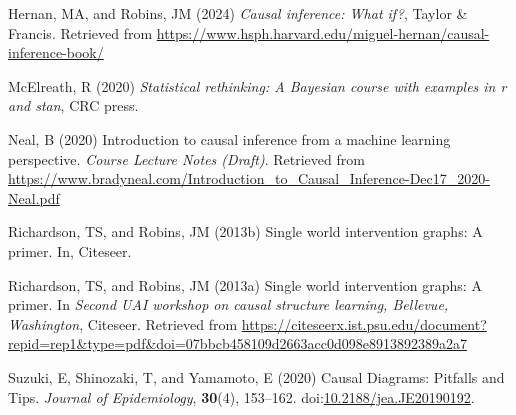 \documentclass[
  single column]{article}
\newlength{\cslhangindent}
\newenvironment{CSLReferences}[2] %
 {\begin{list}{}{%
  \setlength{\itemindent}{0pt}
  \setlength{\leftmargin}{0pt}
  \setlength{\parsep}{0pt}
  \ifodd #1
   \setlength{\leftmargin}{\cslhangindent}
   \setlength{\itemindent}{-1\cslhangindent}
  \fi
  \setlength{\itemsep}{#2\baselineskip}}}
 {\end{list}}
\begin{document}
\label{refs}
\begin{CSLReferences}{1}{0}
Hernan, MA, and Robins, JM (2024) \emph{Causal inference: What if?},
Taylor \& Francis. Retrieved from
\url{https://www.hsph.harvard.edu/miguel-hernan/causal-inference-book/}

McElreath, R (2020) \emph{Statistical rethinking: A {B}ayesian course
with examples in r and stan}, CRC press.

Neal, B (2020) Introduction to causal inference from a machine learning
perspective. \emph{Course Lecture Notes (Draft)}. Retrieved from
\url{https://www.bradyneal.com/Introduction_to_Causal_Inference-Dec17_2020-Neal.pdf}

Richardson, TS, and Robins, JM (2013b) Single world intervention graphs:
A primer. In, Citeseer.

Richardson, TS, and Robins, JM (2013a) Single world intervention graphs:
A primer. In \emph{Second UAI workshop on causal structure learning,
{B}ellevue, {W}ashington}, Citeseer. Retrieved from
\url{https://citeseerx.ist.psu.edu/document?repid=rep1&type=pdf&doi=07bbcb458109d2663acc0d098e8913892389a2a7}

Suzuki, E, Shinozaki, T, and Yamamoto, E (2020) Causal Diagrams:
Pitfalls and Tips. \emph{Journal of Epidemiology}, \textbf{30}(4),
153--162.
doi:\href{https://doi.org/10.2188/jea.JE20190192}{10.2188/jea.JE20190192}.

\end{CSLReferences}
\end{document}
